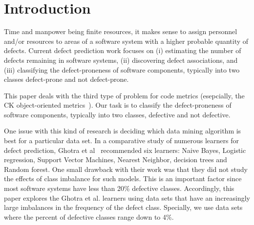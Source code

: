 \documentclass[sigconf]{acmart}
\theoremstyle{break}
\begin{document}



\section{Introduction}

Time and manpower being finite resources, it
makes sense to assign personnel and/or resources to areas of
a software system with a higher probable quantity of defects. Current defect prediction work focuses on (i) estimating the number of defects remaining in software systems, (ii) discovering defect associations, and (iii) classifying the defect-proneness of software components, typically into two classes defect-prone and not defect-prone. 


This paper deals with the third type of problem for code metrics (esepcially, the  CK object-oriented metrics~\cite{chidamber1994metrics}).
Our task is to classify the defect-proneness of software components, typically into two classes, defective and not defective. 

One issue with this kind of research is deciding
which data mining algorithm is best for a particular
data set. In a comparative study of numerous
learners for defect prediction, Ghotra et al~\cite{ghotra2015revisiting} recommended    six learners: Naive Bayes, Logistic regression, Support Vector Machines, Nearest Neighbor, decision trees and Random forest. One small drawback with their
work was that they did not study the effects of class imbalance for such models. This is an important factor
since most software systems have less than 20\% defective classes. Accordingly, this paper
explores the Ghotra et al. learners using data
sets that have an increasingly large imbalances
in the frequency of the defect class. Specially, we use data sets where the percent of defective classes
range down to 4\%.
\end{document}
